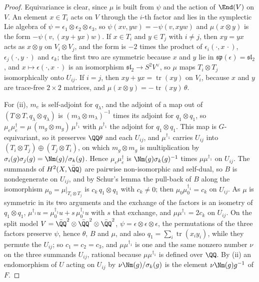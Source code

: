 \begin{proof}
Equivariance is clear, since $\mu$ is built from $\psi$ and the action of
$\End(V)$ on $V$. An element $x\in T_{i}$ acts on $V$ through the $i$-th factor
and lies in the symplectic Lie algebra of $\psi=\epsilon_{1}\otimes
\epsilon_{2}\otimes\epsilon_{3}$, so $\psi(xv,yw)=-\psi(v,xyw)$ and
$\mu(x\otimes y)$ is the form $-\psi(v,(xy+yx)w)$. If $x\in T_{i}$ and
$y\in T_{j}$ with $i\ne j$, then $xy=yx$ acts as $x\otimes y$ on
$V_{i}\otimes V_{j}$, and the form is $-2$ times the product of
$\epsilon_{i}(\cdot,x\,\cdot)$, $\epsilon_{j}(\cdot,y\,\cdot)$ and
$\epsilon_{k}$; the first two are symmetric because $x$ and $y$ lie in
$\mathfrak{sp}(\epsilon)=\mathfrak{sl}_{2}$, and $x\mapsto\epsilon(\cdot,x\,\cdot)$
is an isomorphism $\mathfrak{sl}_{2}\to S^{2}V^{\vee}$, so $\mu$ maps
$T_{i}\otimes T_{j}$ isomorphically onto $U_{ij}$. If $i=j$, then
$xy+yx=\operatorname{tr}(xy)$ on $V_{i}$, because $x$ and $y$ are trace-free
$2\times2$ matrices, and $\mu(x\otimes y)=-\operatorname{tr}(xy)\,\theta$.

For (ii), $m_{e}$ is self-adjoint for $q_{\lambda}$, and the adjoint of a
map out of $(T\otimes T,q_{\lambda}\otimes q_{\lambda})$ is
$(m_{\lambda}\otimes m_{\lambda})^{-1}$ times its adjoint for
$q_{1}\otimes q_{1}$, so
$\mu_{e}\mu_{e}^{\dagger}=\mu\,(m_{g}\otimes m_{g})\,\mu^{\dagger_{1}}$ with
$\mu^{\dagger_{1}}$ the adjoint for $q_{1}\otimes q_{1}$. This map is
$G$-equivariant, so it preserves $\QQ\theta$ and each $U_{ij}$, and
$\mu^{\dagger_{1}}$ carries $U_{ij}$ into
$(T_{i}\otimes T_{j})\oplus(T_{j}\otimes T_{i})$, on which $m_{g}\otimes m_{g}$
is multiplication by $\sigma_{i}(g)\sigma_{j}(g)=\Nm(g)/\sigma_{k}(g)$. Hence
$\mu_{e}\mu_{e}^{\dagger}$ is $\Nm(g)\sigma_{k}(g)^{-1}$ times
$\mu\mu^{\dagger_{1}}$ on $U_{ij}$. The summands of $H^{2}(X,\bar{\QQ})$ are
pairwise non-isomorphic and self-dual, so $B$ is nondegenerate on $U_{ij}$,
and by Schur's lemma the pull-back of $B$ along the isomorphism
$\mu_{0}=\mu|_{T_{i}\otimes T_{j}}$ is $c_{k}\,q_{1}\otimes q_{1}$ with
$c_{k}\ne0$; then $\mu_{0}\mu_{0}^{\dagger_{1}}=c_{k}$ on $U_{ij}$. As $\mu$
is symmetric in its two arguments and the exchange of the factors is an
isometry of $q_{1}\otimes q_{1}$, $\mu^{\dagger_{1}}u=\mu_{0}^{\dagger_{1}}u+
s\,\mu_{0}^{\dagger_{1}}u$ with $s$ that exchange, and $\mu\mu^{\dagger_{1}}=2c_{k}$
on $U_{ij}$. On the split model $V=\bar{\QQ}^{2}\otimes\bar{\QQ}^{2}\otimes
\bar{\QQ}^{2}$, $\psi=\epsilon\otimes\epsilon\otimes\epsilon$, the
permutations of the three factors preserve $\psi$, hence $\theta$, $B$ and
$\mu$, and also $q_{1}=\sum_{i}\operatorname{tr}(x_{i}y_{i})$, while they
permute the $U_{ij}$; so $c_{1}=c_{2}=c_{3}$, and $\mu\mu^{\dagger_{1}}$ is one
and the same nonzero number $\nu$ on the three summands $U_{ij}$, rational
because $\mu\mu^{\dagger_{1}}$ is defined over $\QQ$. By (ii) an endomorphism of $U$ acting
on $U_{ij}$ by $\nu\Nm(g)/\sigma_{k}(g)$ is the element $\nu\Nm(g)g^{-1}$ of
$F$.
\end{proof}

